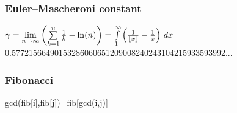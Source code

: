 \subsubsection{Euler–Mascheroni constant}
$\gamma = \lim\limits_{n \rightarrow \infty } \left( \sum\limits_{k=1}^n \frac{1}{k} - \ln(n) \right)=\int\limits_1^\infty\left({1\over\lfloor x\rfloor}-{1\over x}\right)\,dx$\\
0.57721566490153286060651209008240243104215933593992...\\
\subsubsection{Fibonacci}
gcd(fib[i],fib[j])=fib[gcd(i,j)]\\
